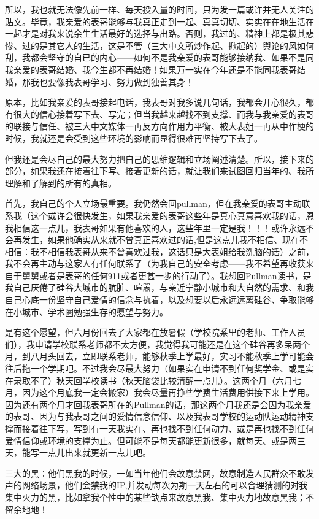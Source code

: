 \documentclass[9pt, b5paper]{article}
\begin{document}
所以，我也就无法像先前一样、每天投入量的时间，只为发一篇或许并无人关注的贴文。毕竟，我亲爱的表哥能够与我真正走到一起、真真切切、实实在在地生活在一起才是对我来说余生生活最好的选择与出路。否则，我过的、精神上都是极其悲惨、过的是其它人的生活，这是不管（三大中文所炒作起、掀起的）舆论的风如何刮，我都会坚守的自已的内心——如何不是我亲爱的表哥能够接纳我、如果不是同我亲爱的表哥结婚、我今生都不再结婚！如果万一实在今年还是不能同我表哥结婚，那我也要像我表哥学习、努力做到独善其身！

原本，比如我亲爱的表哥接起电话，我表哥对我多说几句话，我都会开心很久，都有很大的信心接着写下去、写完；但当我越来越找不到支撑、而我与我亲爱的表哥的联接与信任、被三大中文媒体一再反方向作用力平衡、被大表姐一再从中作梗的时候，我就还是会受到这些环境的影响而显得很难再坚持写下去了。 

但我还是会尽自己的最大努力把自己的思维逻辑和立场阐述清楚。所以，接下来的部分，如果我还在接着往下写、接着更新的话，就让我们来试图回归当年的、我所理解和了解到的所有的真相。

首先，我自己的个人立场最重要。我仍然会回pullman，但在我亲爱的表哥主动联系我（这个或许会很快发生，如果我亲爱的表哥这些年是真心真意喜欢我的话，恩我相信这一点儿，我表哥如果有他喜欢的人，这些年里一定是我！！！或许永远不会再发生，如果他确实从来就不曾真正喜欢过的话,但是这点儿我不相信、现在不相信：我不相信我表哥从来不曾喜欢过我，这话只是大表姐给我洗脑的话）之前，我不会再主动与这家人有任何联系了（为我自己的安全考虑——我不希望再收获来自于舅舅或者是表哥的任何911或者更甚一步的行动了）。我想回Pullman读书，是我自己厌倦了硅谷大城市的肮脏、喧嚣，与亲近宁静小城市和大自然的需求、和我自己心底一份坚守自己爱情的信念与执着，以及想要以后永远远离硅谷、争取能够在小城市、学术圈勉强生存的愿望与努力。

是有这个愿望，但六月份回去了大家都在放暑假（学校院系里的老师、工作人员们），我申请学校联系老师都不太方便，我觉得我可能还是在这个硅谷再多呆两个月，到八月头回去，立即联系老师，能够秋季上学最好，实习不能秋季上学可能会往后拖一个学期吧。不过我会尽最大努力（如果实在申请不到任何奖学金、或是实在录取不了）秋天回学校读书（秋天脑袋比较清醒一点儿）。这两个月（六月七月，因为这个月底我一定会搬家）我会尽量再挣些学费生活费用供接下来上学用。因为还有两个月才回我表哥所在的Pullman的话，那这两个月我还是会因为我亲爱的表哥、因为与我表哥之间的爱情信念信仰、以及我表哥学校的运动队运动精神支撑而接着往下写，写到有一天我实在、再也找不到任何动力、或是再也找不到任何爱情信仰或环境的支撑为止。但可能不是每天都能更新很多，就每天、或是两三天，能写一点儿出来就更新一点儿吧。

三大的黑：他们黑我的时候，一如当年他们会故意禁网，故意制造人民群众不敢发声的网络场景，他们会禁我的IP,并发动每次为期一天左右的可以合理猜测的对我集中火力的黑，比如拿我个性中的某些缺点来故意黑我、集中火力地故意黑我；不留余地地！
\end{document}
